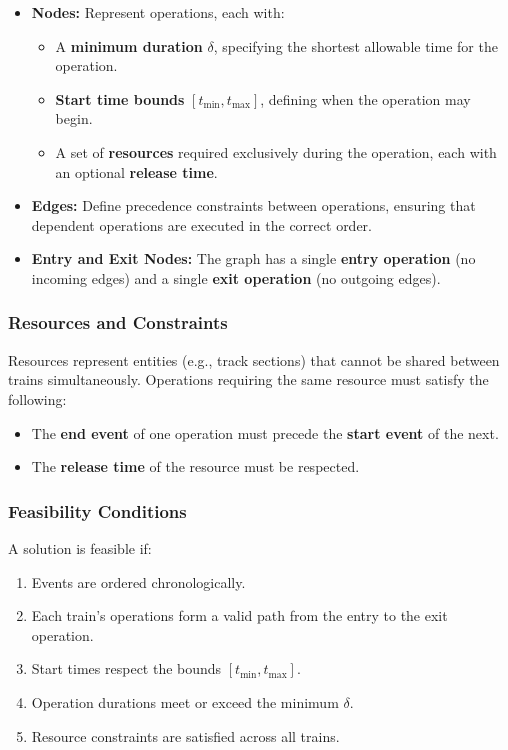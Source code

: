 \documentclass[runningheads]{llncs}
\begin{document}
\begin{itemize}
    \item \textbf{Nodes:} Represent operations, each with:
    \begin{itemize}
        \item A \textbf{minimum duration} $\delta$, specifying the shortest allowable time for the operation.
        \item \textbf{Start time bounds} $[t_{\text{min}}, t_{\text{max}}]$, defining when the operation may begin.
        \item A set of \textbf{resources} required exclusively during the operation, each with an optional \textbf{release time}.
    \end{itemize}
    \item \textbf{Edges:} Define precedence constraints between operations, ensuring that dependent operations are executed in the correct order.
    \item \textbf{Entry and Exit Nodes:} The graph has a single \textbf{entry operation} (no incoming edges) and a single \textbf{exit operation} (no outgoing edges).
\end{itemize}

\subsubsection{Resources and Constraints}
Resources represent entities (e.g., track sections) that cannot be shared between trains simultaneously. Operations requiring the same resource must satisfy the following:
\begin{itemize}
    \item The \textbf{end event} of one operation must precede the \textbf{start event} of the next.
    \item The \textbf{release time} of the resource must be respected.
\end{itemize}

\subsubsection{Feasibility Conditions}
A solution is feasible if:
\begin{enumerate}
    \item Events are ordered chronologically.
    \item Each train's operations form a valid path from the entry to the exit operation.
    \item Start times respect the bounds $[t_{\text{min}}, t_{\text{max}}]$.
    \item Operation durations meet or exceed the minimum $\delta$.
    \item Resource constraints are satisfied across all trains.
\end{enumerate}
\end{document}
